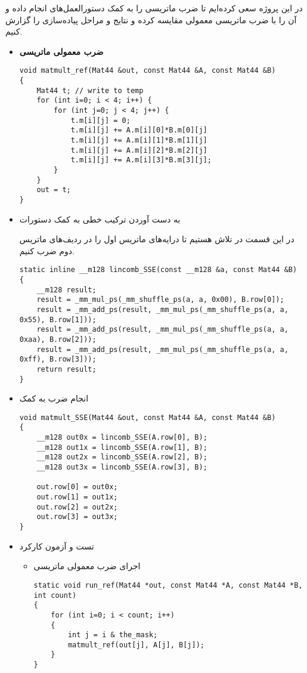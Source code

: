
در این پروژه سعی کرده‌ایم تا ضرب ماتریسی را به کمک دستورالعمل‌های  انجام داده و آن را با ضرب ماتریسی معمولی مقایسه کرده و نتایج و مراحل پیاده‌سازی را گزارش کنیم.

\begin{itemize}
	\item \textbf{ضرب معمولی ماتریسی}
	\begin{Verbatim}[tabsize=4]
void matmult_ref(Mat44 &out, const Mat44 &A, const Mat44 &B)
{
	Mat44 t; // write to temp
	for (int i=0; i < 4; i++) {
		for (int j=0; j < 4; j++) {
			t.m[i][j] = 0;
			t.m[i][j] += A.m[i][0]*B.m[0][j] 
			t.m[i][j] += A.m[i][1]*B.m[1][j]
			t.m[i][j] += A.m[i][2]*B.m[2][j]
			t.m[i][j] += A.m[i][3]*B.m[3][j];
		}
	}
	out = t;
}
	\end{Verbatim}
	\item به دست آوردن ترکیب خطی به کمک دستورات 
	
	در این قسمت در تلاش هستیم تا درایه‌های ماتریس اول را در ردیف‌های ماتریس دوم ضرب کنیم.
	\begin{Verbatim}[tabsize=4]
static inline __m128 lincomb_SSE(const __m128 &a, const Mat44 &B)
{
	__m128 result;
	result = _mm_mul_ps(_mm_shuffle_ps(a, a, 0x00), B.row[0]);
	result = _mm_add_ps(result, _mm_mul_ps(_mm_shuffle_ps(a, a, 0x55), B.row[1]));
	result = _mm_add_ps(result, _mm_mul_ps(_mm_shuffle_ps(a, a, 0xaa), B.row[2]));
	result = _mm_add_ps(result, _mm_mul_ps(_mm_shuffle_ps(a, a, 0xff), B.row[3]));
	return result;
}
	\end{Verbatim}
	\item انجام ضرب به کمک 
	\begin{Verbatim}[tabsize=4]
void matmult_SSE(Mat44 &out, const Mat44 &A, const Mat44 &B)
{
	__m128 out0x = lincomb_SSE(A.row[0], B);
	__m128 out1x = lincomb_SSE(A.row[1], B);
	__m128 out2x = lincomb_SSE(A.row[2], B);
	__m128 out3x = lincomb_SSE(A.row[3], B);
	
	out.row[0] = out0x;
	out.row[1] = out1x;
	out.row[2] = out2x;
	out.row[3] = out3x;
}
	\end{Verbatim}
	\item تست و آزمون کارکرد 
		\begin{itemize}
			\item اجرای ضرب معمولی ماتریسی
			\begin{Verbatim}[tabsize=4]
static void run_ref(Mat44 *out, const Mat44 *A, const Mat44 *B, int count)
{
	for (int i=0; i < count; i++)
	{
		int j = i & the_mask;
		matmult_ref(out[j], A[j], B[j]);
	}
}


\end{Verbatim}
\end{itemize}
\end{itemize}
